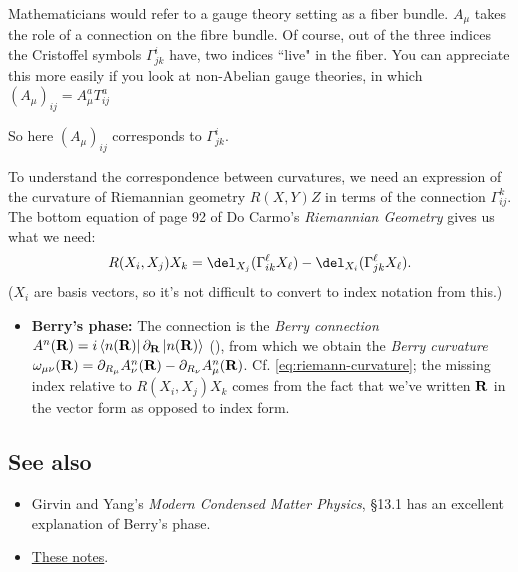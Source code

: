 \documentclass{report}
\begin{document}
\begin{quotebox}
	Mathematicians would refer to a gauge theory setting as a fiber
	bundle. $ A_\mu $ takes the role of a connection on the fibre bundle. Of course,
	out of the three indices the Cristoffel symbols $ \Gamma^{i}_{jk} $ have, two
	indices ``live" in the fiber. You can appreciate this more easily if you look at
	non-Abelian gauge
	theories, in which $ (A_\mu)_{ij}  = A^a_\mu T_{ij}^a$
\end{quotebox}
So here $ (A_\mu)_{ij} $ corresponds to $ \Gamma_{jk}^i $.

To understand the correspondence between curvatures, we need an expression 
of the curvature of Riemannian geometry $ R(X,Y)Z $ in terms of the connection 
$ \Gamma_{ij}^k $. The bottom equation of page 92 of Do Carmo's
\textit{Riemannian Geometry} gives us what we need: 
\begin{equation}\label{eq:riemann-curvature}
	R(X_i, X_j)X_k = \del_{X_j}(\Gamma^{\ell}_{ik}X_\ell)
	- \del_{X_i}(\Gamma^{\ell}_{jk}X_\ell).
\end{equation}
($ X_i $ are basis vectors, so it's not difficult to convert to index notation
from this.)

\begin{itemize}
\item \textbf{Berry's phase:} The connection is the \textit{Berry connection}
	$ A^n(\vb{R}) = i \bra{n(\vb{R})} \partial_{\vb{R}}\ket{n(\vb{R})}$ 
	(), from which we obtain the \textit{Berry
	curvature} $ \omega_{\mu\nu} (\vb{R}) = \partial_{R_\mu}A^n_\nu(\vb{R}) -
	\partial_{R_\nu} A^n_\mu (\vb{R})$. Cf. \cref{eq:riemann-curvature}; 
	the missing index relative to $ R(X_i, X_j)X_k $ comes from the fact 
	that we've written $ \vb{R} $ in the vector form as opposed to index 
	form. 
\end{itemize}


\subsection*{See also}
\begin{itemize}
\item Girvin and Yang's \textit{Modern Condensed Matter Physics}, \S 13.1 
	has an excellent explanation of Berry's phase. 
\item \href{https://arxiv.org/abs/hep-th/0611201}{These notes}.
\end{itemize}
\end{document}
